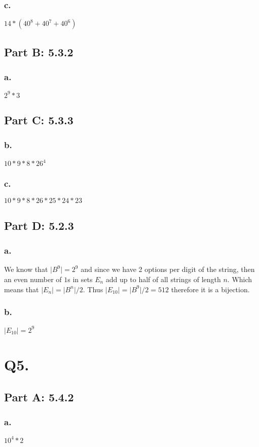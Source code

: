 \documentclass[titlepage]{article}\pagestyle{empty}
\begin{document}
\subsubsection*{c.} $14 * (40^8 + 40^7 + 40^6)$
\subsection*{Part B: 5.3.2}
\subsubsection*{a.} $2^9 * 3$
\subsection*{Part C: 5.3.3}
\subsubsection*{b.} $10 * 9 * 8 * 26^4$
\subsubsection*{c.} $10 * 9 * 8 * 26 * 25 * 24 * 23$
\subsection*{Part D: 5.2.3}
\subsubsection*{a.}
We know that $\vert B^9\vert = 2^9$ and since we have 2 options per digit of the string, then an even number of $1$s in sets $E_n$ add up to half of all strings of length $n$. Which means that $\vert E_n\vert = \vert B^n\vert/2$. Thus $\vert E_{10}\vert=\vert B^9\vert/2=512$ therefore it is a bijection.
\subsubsection*{b.} $\vert E_{10}\vert=2^9$

\pagebreak
\section*{Q5.}
\subsection*{Part A: 5.4.2}
\subsubsection*{a.} $10^4 * 2$
\end{document}
